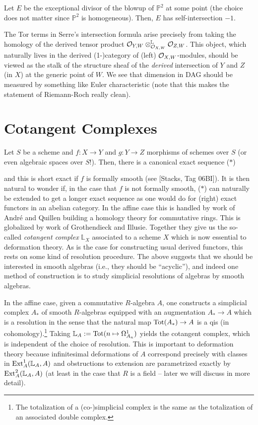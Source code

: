 \documentclass[11pt]{article}
\renewcommand{\L}{\mathbb{L}}
\renewcommand{\P}{\mathbb{P}}
\begin{document}
\begin{example}
Let $E$ be the exceptional divisor of the blowup of $\P^2$ at some point (the choice does not matter since $\P^2$ is homogeneous). Then, $E$ has self-intersection $-1$.
\end{example}

The Tor terms in Serre's intersection formula arise precisely from taking the homology of the derived tensor product $\mathcal{O}_{Y,W}\otimes^{\mathbb{L}}_{\mathcal{O}_{X,W}}\mathcal{O}_{Z,W}$. This object, which naturally lives in the derived (1-)category of (left) $\mathcal{O}_{X,W}$-modules, should be viewed as the stalk of the structure sheaf of the \emph{derived} intersection of $Y$ and $Z$ (in $X$) at the generic point of $W$. We see that dimension in DAG should be measured by something like Euler characteristic (note that this makes the statement of Riemann-Roch really clean).

\section{Cotangent Complexes}
Let $S$ be a scheme and $f:X\to Y$ and $g: Y\to Z$ morphisms of schemes over $S$ (or even algebraic spaces over $S$!). Then, there is a canonical exact sequence \textup{($*$)}
\begin{center}
\end{center}
and this is short exact if $f$ is formally smooth (see [Stacks, Tag 06BI]). It is then natural to wonder if, in the case that $f$ is not formally smooth, \textup{($*$)} can naturally be extended to get a longer exact sequence as one would do for (right) exact functors in an abelian category. In the affine case this is handled by work of Andr\'{e} and Quillen building a homology theory for commutative rings. This is globalized by work of Grothendieck and Illusie. Together they give us the so-called \emph{cotangent complex} $\L_X$ associated to a scheme $X$ which is now essential to deformation theory. As is the case for constructing usual derived functors, this rests on some kind of resolution procedure. The above suggests that we should be interested in smooth algebras (i.e., they should be ``acyclic''), and indeed one method of construction is to study simplicial resolutions of algebras by smooth algebras.

In the affine case, given a commutative $R$-algebra $A$, one constructs a simplicial complex $A_*$ of smooth $R$-algebras equipped with an augmentation $A_*\to A$ which is a resolution in the sense that the natural map $\operatorname{Tot}(A_*)\to A$ is a qis (in cohomology).\footnote{The totalization of a (co-)simplicial complex is the same as the totalization of an associated double complex.} Taking $\L_A:=\Tot(n\mapsto\Omega_{A_n}^1)$ yields the cotangent complex, which is independent of the choice of resolution. This is important to deformation theory because infinitesimal deformations of $A$ correspond precisely with classes in $\Ext_A^1(\L_A,A)$ and obstructions to extension are parametrized exactly by $\Ext_A^2(\L_A,A)$ (at least in the case that $R$ is a field -- later we will discuss in more detail).
\end{document}
